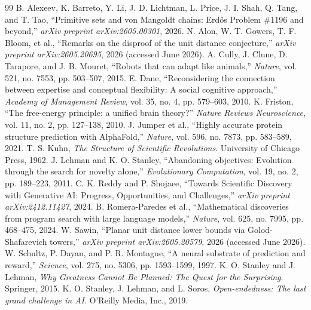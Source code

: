 \documentclass[10pt,journal,compsoc]{IEEEtran}
\begin{document}
\begin{thebibliography}{99}
 B. Alexeev, K. Barreto, Y. Li, J. D. Lichtman, L. Price, J. I. Shah, Q. Tang, and T. Tao, ``Primitive sets and von Mangoldt chains: Erdős Problem \#1196 and beyond,'' \textit{arXiv preprint arXiv:2605.00301}, 2026.
 N. Alon, W. T. Gowers, T. F. Bloom, et al., ``Remarks on the disproof of the unit distance conjecture,'' \textit{arXiv preprint arXiv:2605.20695}, 2026 (accessed June 2026).
 A. Cully, J. Clune, D. Tarapore, and J. B. Mouret, ``Robots that can adapt like animals,'' \textit{Nature}, vol. 521, no. 7553, pp. 503--507, 2015.
 E. Dane, ``Reconsidering the connection between expertise and conceptual flexibility: A social cognitive approach,'' \textit{Academy of Management Review}, vol. 35, no. 4, pp. 579--603, 2010.
 K. Friston, ``The free-energy principle: a unified brain theory?'' \textit{Nature Reviews Neuroscience}, vol. 11, no. 2, pp. 127--138, 2010.
 J. Jumper et al., ``Highly accurate protein structure prediction with AlphaFold,'' \textit{Nature}, vol. 596, no. 7873, pp. 583--589, 2021.
 T. S. Kuhn, \textit{The Structure of Scientific Revolutions}. University of Chicago Press, 1962.
 J. Lehman and K. O. Stanley, ``Abandoning objectives: Evolution through the search for novelty alone,'' \textit{Evolutionary Computation}, vol. 19, no. 2, pp. 189--223, 2011.
 C. K. Reddy and P. Shojaee, ``Towards Scientific Discovery with Generative AI: Progress, Opportunities, and Challenges,'' \textit{arXiv preprint arXiv:2412.11427}, 2024.
 B. Romera-Paredes et al., ``Mathematical discoveries from program search with large language models,'' \textit{Nature}, vol. 625, no. 7995, pp. 468--475, 2024.
 W. Sawin, ``Planar unit distance lower bounds via Golod-Shafarevich towers,'' \textit{arXiv preprint arXiv:2605.20579}, 2026 (accessed June 2026).
 W. Schultz, P. Dayan, and P. R. Montague, ``A neural substrate of prediction and reward,'' \textit{Science}, vol. 275, no. 5306, pp. 1593--1599, 1997.
 K. O. Stanley and J. Lehman, \textit{Why Greatness Cannot Be Planned: The Quest for the Surprising}. Springer, 2015.
 K. O. Stanley, J. Lehman, and L. Soros, \textit{Open-endedness: The last grand challenge in AI}. O'Reilly Media, Inc., 2019.
\end{thebibliography}
\end{document}
